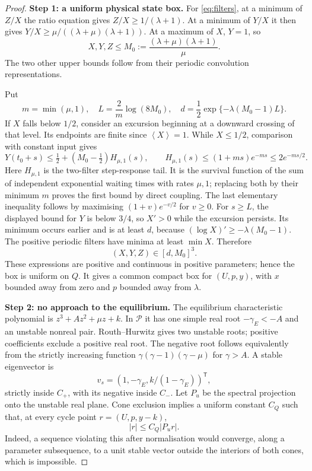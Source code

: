 \documentclass[11pt,a4paper]{article}
\numberwithin{equation}{section}
\theoremstyle{remark}\newtheorem{remark}[theorem]{Remark}
\newcommand{\avg}[1]{\left\langle #1\right\rangle}
\newcommand{\cP}{\mathcal P}
\begin{document}
\begin{proof}
\textbf{Step 1: a uniform physical state box.}
For \eqref{eq:filters}, at a minimum of $Z/X$ the ratio equation gives
$Z/X\ge1/(\lambda+1)$. At a minimum of $Y/X$ it then gives
$Y/X\ge\mu/((\lambda+\mu)(\lambda+1))$. At a maximum of $X$, $Y=1$, so
\begin{equation}\label{eq:statebox}
X,Y,Z\le M_0:=\frac{(\lambda+\mu)(\lambda+1)}{\mu}.
\end{equation}
The two other upper bounds follow from their periodic convolution representations.

Put
\[
m=\min(\mu,1),\quad L=\frac2m\log(8M_0),\quad
 d=\frac12\exp\{-\lambda(M_0-1)L\}.
\]
If $X$ falls below $1/2$, consider an excursion beginning at a downward crossing of that level. Its endpoints are finite since $\avg X=1$. While $X\le1/2$, comparison with constant input gives
\[
Y(t_0+s)\le\tfrac12+(M_0-\tfrac12)H_{\mu,1}(s),\qquad
H_{\mu,1}(s)\le(1+ms)e^{-ms}\le2e^{-ms/2}.
\]
Here $H_{\mu,1}$ is the two-filter step-response tail. It is the survival function of the sum of independent exponential waiting times with rates $\mu,1$; replacing both by their minimum $m$ proves the first bound by direct coupling. The last elementary inequality follows by maximising $(1+v)e^{-v/2}$ for $v\ge0$.
For $s\ge L$, the displayed bound for $Y$ is below $3/4$, so $X'>0$ while the excursion persists. Its minimum occurs earlier and is at least $d$, because $(\log X)'\ge-\lambda(M_0-1)$. The positive periodic filters have minima at least $\min X$. Therefore
\begin{equation}\label{eq:twosidedbox}
(X,Y,Z)\in[d,M_0]^3.
\end{equation}
These expressions are positive and continuous in positive parameters; hence the box is uniform on $Q$. It gives a common compact box for $(U,p,y)$, with $x$ bounded away from zero and $p$ bounded away from $\lambda$.

\textbf{Step 2: no approach to the equilibrium.}
The equilibrium characteristic polynomial is $z^3+Az^2+\mu z+k$. In $\cP$ it has one simple real root $-\gamma_E<-A$ and an unstable nonreal pair. Routh--Hurwitz gives two unstable roots; positive coefficients exclude a positive real root. The negative root follows equivalently from the strictly increasing function $\gamma(\gamma-1)(\gamma-\mu)$ for $\gamma>A$.
A stable eigenvector is
\[
v_s=(1,-\gamma_E,k/(1-\gamma_E))^{\mathsf T},
\]
strictly inside $C_+$, with its negative inside $C_-$. Let $P_u$ be the spectral projection onto the unstable real plane. Cone exclusion implies a uniform constant $C_Q$ such that, at every cycle point $r=(U,p,y-k)$,
\begin{equation}\label{eq:anglebound}
|r|\le C_Q|P_ur|.
\end{equation}
Indeed, a sequence violating this after normalisation would converge, along a parameter subsequence, to a unit stable vector outside the interiors of both cones, which is impossible.


\end{proof}
\end{document}
